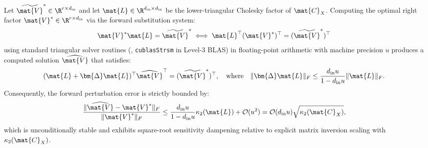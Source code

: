 \begin{lemma}
\label{lem:triangular_solve_stability}
Let $\widetilde{\mat{V}}^* \in \R^{r \times d_{\text{in}}}$ and let $\mat{L} \in \R^{d_{\text{in}} \times d_{\text{in}}}$ be the lower-triangular Cholesky factor of $\mat{C}_X$.
Computing the optimal right factor $\mat{V}^* \in \R^{r \times d_{\text{in}}}$ via the forward substitution system:
\begin{equation}
\mat{V}^* \mat{L} = \widetilde{\mat{V}}^* \iff \mat{L}^\top (\mat{V}^*)^\top = (\widetilde{\mat{V}}^*)^\top
\label{eq:triangular_system_solve}
\end{equation}
using standard triangular solver routines (\eg, \texttt{cublasStrsm} in Level-3 BLAS) in floating-point arithmetic with machine precision $u$ produces a computed solution $\widehat{\mat{V}}$ that satisfies:
\begin{equation}
(\mat{L} + \bm{\Delta}\mat{L})^\top \widehat{\mat{V}}^\top = (\widetilde{\mat{V}}^*)^\top, \quad \text{where} \quad \|\bm{\Delta}\mat{L}\|_F \le \frac{d_{\text{in}} u}{1 - d_{\text{in}} u} \|\mat{L}\|_F.
\label{eq:triangular_backward_error}
\end{equation}
Consequently, the forward perturbation error is strictly bounded by:
\begin{equation}
\frac{\|\widehat{\mat{V}} - \mat{V}^*\|_F}{\|\mat{V}^*\|_F} \le \frac{d_{\text{in}} u}{1 - d_{\text{in}} u} \kappa_2(\mat{L}) + \mathcal{O}(u^2) = \mathcal{O}(d_{\text{in}} u) \sqrt{\kappa_2(\mat{C}_X)},
\label{eq:forward_triangular_solve_bound}
\end{equation}
which is unconditionally stable and exhibits square-root sensitivity dampening relative to explicit matrix inversion scaling with $\kappa_2(\mat{C}_X)$.
\end{lemma}

